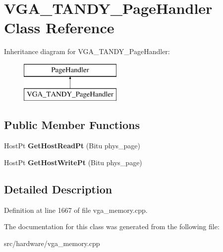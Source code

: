 \hypertarget{classVGA__TANDY__PageHandler}{\section{V\-G\-A\-\_\-\-T\-A\-N\-D\-Y\-\_\-\-Page\-Handler Class Reference}
\label{classVGA__TANDY__PageHandler}
}
Inheritance diagram for V\-G\-A\-\_\-\-T\-A\-N\-D\-Y\-\_\-\-Page\-Handler\-:\begin{figure}[H]
\begin{center}
\leavevmode
\includegraphics[height=2.000000cm]{classVGA__TANDY__PageHandler}
\end{center}
\end{figure}
\subsection*{Public Member Functions}
\begin{DoxyCompactItemize}
\item 
\hypertarget{classVGA__TANDY__PageHandler_a8c39c6f07a7c47fa66839f49dbac7585}{Host\-Pt {\bfseries Get\-Host\-Read\-Pt} (Bitu phys\-\_\-page)}\label{classVGA__TANDY__PageHandler_a8c39c6f07a7c47fa66839f49dbac7585}

\item 
\hypertarget{classVGA__TANDY__PageHandler_aa7f32d214017a07179bc6b8187028e69}{Host\-Pt {\bfseries Get\-Host\-Write\-Pt} (Bitu phys\-\_\-page)}\label{classVGA__TANDY__PageHandler_aa7f32d214017a07179bc6b8187028e69}

\end{DoxyCompactItemize}


\subsection{Detailed Description}


Definition at line 1667 of file vga\-\_\-memory.\-cpp.



The documentation for this class was generated from the following file\-:\begin{DoxyCompactItemize}
\item 
src/hardware/vga\-\_\-memory.\-cpp\end{DoxyCompactItemize}
